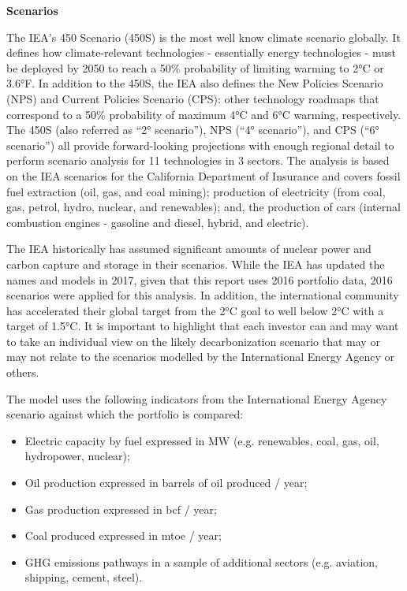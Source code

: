 \documentclass[10pt,table,a4]{article}\usepackage[]{graphicx}\usepackage[]{color}
\begin{document}
\begin{multicols}{2}
		\textbf{Scenarios}
		
		The IEA’s 450 Scenario (450S) is the most well know climate scenario globally. It defines how climate-relevant technologies - 	essentially energy technologies - must be deployed by 2050 to reach a 50\% probability of limiting warming to 2°C or 3.6°F. In addition to the 450S, the IEA also defines the New Policies Scenario (NPS) and Current Policies Scenario (CPS): other technology roadmaps that correspond to a 50\% probability of maximum 4°C and 6°C warming, respectively. The 450S (also referred as “2° scenario”), NPS (“4° scenario”), and CPS (“6° scenario”) all provide forward-looking projections with enough regional detail to perform scenario analysis for 11 technologies in 3 sectors. The analysis is based on the IEA scenarios for the California Department of Insurance and covers fossil fuel extraction (oil, gas, and coal mining); production of electricity (from coal, gas, petrol, hydro, nuclear, and renewables); and, the production of cars (internal combustion engines - gasoline and diesel, hybrid, and electric).
		
		The IEA historically has assumed significant amounts of nuclear power and carbon capture and storage in their scenarios. While the IEA has updated the names and models in 2017, given that this report uses 2016 portfolio data, 2016 scenarios were applied for this analysis. In addition, the international community has accelerated their global target from the 2°C goal to well below 2°C with a target of 1.5°C. It is important to highlight that each investor can and may want to take an individual view on the likely decarbonization scenario that may or may not relate to the scenarios modelled by the International Energy Agency or others.
		
		The model uses the following indicators from the International Energy Agency scenario against which the portfolio is compared:
		\begin{itemize}
			\item{Electric capacity by fuel expressed in MW (e.g. renewables, coal, gas, oil, hydropower, nuclear);}
			\item{Oil production expressed in barrels of oil produced / year;}
			\item{Gas production expressed in bcf / year;}
			\item{Coal produced expressed in mtoe / year;}
			\item{GHG emissions pathways in a sample of additional sectors (e.g. aviation, shipping, cement, steel).}
		\end{itemize}
		

\end{multicols}
\end{document}
